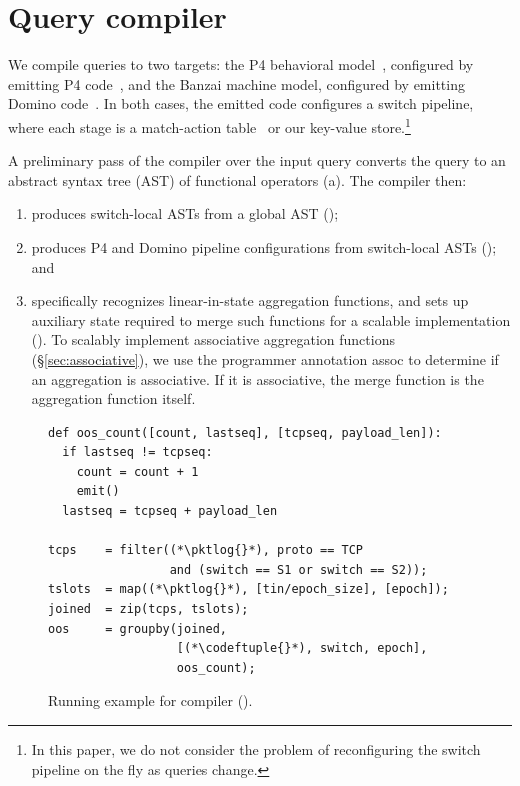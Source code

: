 \section{Query compiler}
\label{sec:compiler}

We compile \TheSystem queries to two targets: the P4 behavioral
model~\cite{p4-bmv2}, configured by emitting P4 code~\cite{p4_16}, and the
Banzai machine model, configured by emitting Domino code~\cite{domino_sigcomm}.
In both cases, the emitted code configures a switch pipeline, where each stage
is a match-action table~\cite{rmt} or our key-value
store.\footnote{In this paper, we do not consider the problem of reconfiguring
the switch pipeline on the fly as queries change.}

A preliminary pass of the compiler over the input query converts the query to an
abstract syntax tree (AST) of functional operators (a). The compiler then:
\begin{enumerate}
\item produces switch-local ASTs from a global AST
  ();
\item produces P4 and Domino pipeline configurations from switch-local ASTs
  (); and
\item specifically recognizes linear-in-state aggregation functions, and sets up
  auxiliary state required to merge such functions for a scalable implementation
  (). To scalably implement associative
  aggregation functions (\S\ref{sec:associative}), we use the programmer
  annotation {\ct assoc} to determine if an aggregation is associative. If it is
  associative, the merge function is the aggregation function itself.
\end{enumerate}

\begin{figure}[!t]{
\figcodesize
\begin{lstlisting}
def oos_count([count, lastseq], [tcpseq, payload_len]):
  if lastseq != tcpseq:
    count = count + 1
    emit()
  lastseq = tcpseq + payload_len

tcps    = filter((*\pktlog{}*), proto == TCP
                 and (switch == S1 or switch == S2));
tslots  = map((*\pktlog{}*), [tin/epoch_size], [epoch]);
joined  = zip(tcps, tslots);
oos     = groupby(joined,
                  [(*\codeftuple{}*), switch, epoch],
                  oos_count);
\end{lstlisting}
}
\caption{Running example for \TheSystem compiler ().}
\label{fig:running-example-code}
\end{figure}

